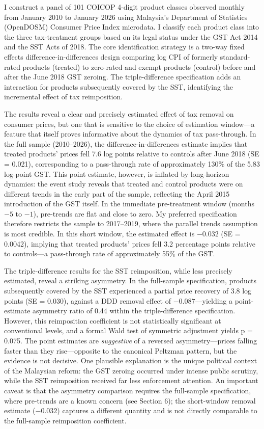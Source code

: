 \documentclass[12pt]{article}
\begin{document}
I construct a panel of 101 COICOP 4-digit product classes observed monthly from January 2010 to January 2026 using Malaysia's Department of Statistics (OpenDOSM) Consumer Price Index microdata. I classify each product class into the three tax-treatment groups based on its legal status under the GST Act 2014 and the SST Acts of 2018. The core identification strategy is a two-way fixed effects difference-in-differences design comparing log CPI of formerly standard-rated products (treated) to zero-rated and exempt products (control) before and after the June 2018 GST zeroing. The triple-difference specification adds an interaction for products subsequently covered by the SST, identifying the incremental effect of tax reimposition.

The results reveal a clear and precisely estimated effect of tax removal on consumer prices, but one that is sensitive to the choice of estimation window---a feature that itself proves informative about the dynamics of tax pass-through. In the full sample (2010--2026), the difference-in-differences estimate implies that treated products' prices fell 7.6 log points relative to controls after June 2018 (SE = 0.021), corresponding to a pass-through rate of approximately 130\% of the 5.83 log-point GST. This point estimate, however, is inflated by long-horizon dynamics: the event study reveals that treated and control products were on different trends in the early part of the sample, reflecting the April 2015 introduction of the GST itself. In the immediate pre-treatment window (months $-5$ to $-1$), pre-trends are flat and close to zero. My preferred specification therefore restricts the sample to 2017--2019, where the parallel trends assumption is most credible. In this short window, the estimated effect is $-0.032$ (SE = 0.0042), implying that treated products' prices fell 3.2 percentage points relative to controls---a pass-through rate of approximately 55\% of the GST.

The triple-difference results for the SST reimposition, while less precisely estimated, reveal a striking asymmetry. In the full-sample specification, products subsequently covered by the SST experienced a partial price recovery of 3.8 log points (SE = 0.030), against a DDD removal effect of $-0.087$---yielding a point-estimate asymmetry ratio of 0.44 within the triple-difference specification. However, this reimposition coefficient is not statistically significant at conventional levels, and a formal Wald test of symmetric adjustment yields p = 0.075. The point estimates are \emph{suggestive} of a reversed asymmetry---prices falling faster than they rise---opposite to the canonical Peltzman pattern, but the evidence is not decisive. One plausible explanation is the unique political context of the Malaysian reform: the GST zeroing occurred under intense public scrutiny, while the SST reimposition received far less enforcement attention. An important caveat is that the asymmetry comparison requires the full-sample specification, where pre-trends are a known concern (see Section 6); the short-window removal estimate ($-0.032$) captures a different quantity and is not directly comparable to the full-sample reimposition coefficient.
\end{document}
